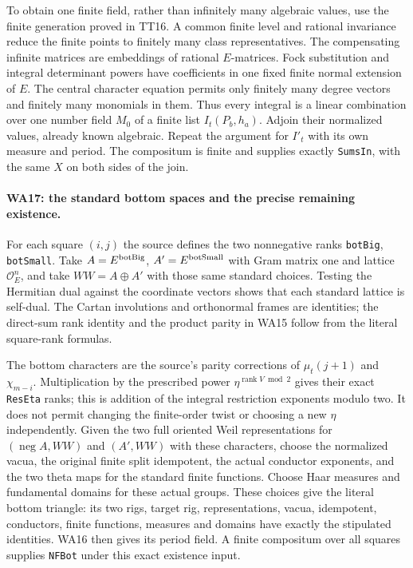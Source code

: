 To obtain one finite field, rather than infinitely many algebraic
values, use the finite generation proved in TT16.  A common
finite level and rational invariance reduce the finite points to
finitely many class representatives.  The compensating infinite
matrices are embeddings of rational $E$-matrices.  Fock
substitution and integral determinant powers have coefficients
in one fixed finite normal extension of $E$.  The central
character equation permits only finitely many degree vectors
and finitely many monomials in them.  Thus every integral is a
linear combination over one number field $M_0$ of a finite list
$I_t(P_b,h_a)$.  Adjoin their normalized values, already known
algebraic.  Repeat the argument for $I'_t$ with its own measure
and period.  The compositum is finite and supplies exactly
\texttt{SumsIn}, with the same $X$ on both sides of the join.

\paragraph{WA17: the standard bottom spaces and the precise remaining existence.}
For each square $(i,j)$ the source defines the two nonnegative
ranks \texttt{botBig}, \texttt{botSmall}.  Take $A=E^{\rm botBig}$,
$A'=E^{\rm botSmall}$ with Gram matrix one and lattice
$\mathcal O_E^n$, and take $WW=A\oplus A'$ with those same
standard choices.  Testing the Hermitian dual against the
coordinate vectors shows that each standard lattice is
self-dual.  The Cartan involutions and orthonormal frames are
identities; the direct-sum rank identity and the product parity
in WA15 follow from the literal square-rank formulas.

The bottom characters are the source's parity corrections of
$\mu_t(j+1)$ and $\chi_{m-i}$.  Multiplication by the prescribed
power $\eta^{\operatorname{rank}V\bmod2}$ gives their exact
\texttt{ResEta} ranks; this is addition of the integral
restriction exponents modulo two.  It does not permit changing
the finite-order twist or choosing a new $\eta$ independently.
Given the two full oriented Weil representations for
$(\operatorname{neg}A,WW)$ and $(A',WW)$ with these characters,
choose the normalized vacua, the original finite split
idempotent, the actual conductor exponents, and the two theta
maps for the standard finite functions.  Choose Haar measures
and fundamental domains for these actual groups.  These choices
give the literal bottom triangle: its two rigs, target rig,
representations, vacua, idempotent, conductors, finite functions,
measures and domains have exactly the stipulated identities.
WA16 then gives its period field.  A finite compositum over all
squares supplies \texttt{NFBot} under this exact existence input.

